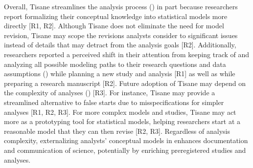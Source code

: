 Overall, Tisane streamlines the analysis process (\rqWorkflow) in part because
researchers report formalizing their conceptual knowledge into statistical
models more directly [R1, R2]. Although Tisane does not eliminate the need for
model revision, Tisane may scope the revisions analysts consider to significant
issues instead of details that may detract from the analysis goals [R2].
Additionally, researchers reported a perceived shift in their attention from
keeping track of and analyzing all possible modeling paths to their research
questions and data assumptions (\rqCognitive) while planning a new study and
analysis [R1] as well as while preparing a research manuscript [R2]. Future
adoption of Tisane may depend on the complexity of analyses (\rqFuture) [R3].
For instance, Tisane may provide a streamlined alternative to false starts due
to misspecifications for simpler analyses [R1, R2, R3]. For more complex models
and studies, Tisane may act more as a prototyping tool for statistical models,
helping researchers start at a reasonable model that they can then revise [R2,
R3]. Regardless of analysis complexity, externalizing analysts' conceptual
models in \tisane enhances documentation and communication of science,
potentially by enriching preregistered studies and analyses.



